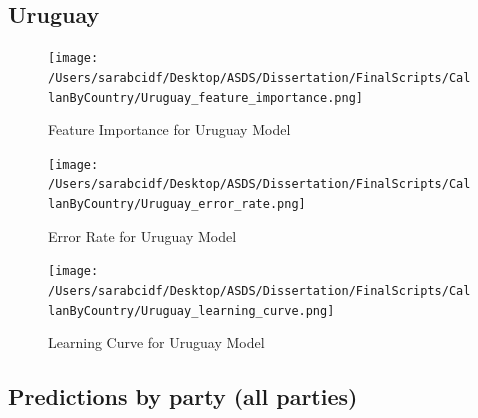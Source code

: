 \documentclass[12pt,letterpaper]{article}
\begin{document}
	\newpage
	
	\subsection{Uruguay}
	\begin{figure}[H]
		\centering
		\caption{Feature Importance for Uruguay Model}
		\texttt{[image: /Users/sarabcidf/Desktop/ASDS/Dissertation/FinalScripts/CallanByCountry/Uruguay\_feature\_importance.png]}
	\end{figure}
	\begin{figure}[H]
		\centering
		\caption{Error Rate for Uruguay Model}
		\texttt{[image: /Users/sarabcidf/Desktop/ASDS/Dissertation/FinalScripts/CallanByCountry/Uruguay\_error\_rate.png]}
	\end{figure}
	\begin{figure}[H]
		\centering
		\caption{Learning Curve for Uruguay Model}
		\texttt{[image: /Users/sarabcidf/Desktop/ASDS/Dissertation/FinalScripts/CallanByCountry/Uruguay\_learning\_curve.png]}
	\end{figure}
	
	\subsection{Predictions by party (all parties)}
	
\end{document}
